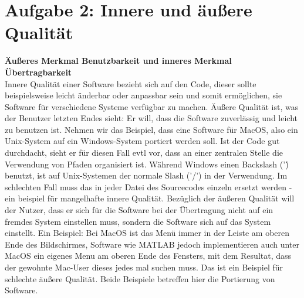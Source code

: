 \documentclass[a4paper,11pt]{article}
\begin{document}
\section*{Aufgabe 2: Innere und äußere Qualität}

\textbf{Äußeres Merkmal Benutzbarkeit und inneres Merkmal Übertragbarkeit
}\\

Innere Qualität einer Software bezieht sich auf den Code, dieser sollte beispielsweise leicht änderbar oder anpassbar sein und somit ermöglichen, sie Software für verschiedene Systeme verfügbar zu machen. Äußere Qualität ist, was der Benutzer letzten Endes sieht: Er will, dass die Software zuverlässig und leicht zu benutzen ist.
Nehmen wir das Beispiel, dass eine Software für MacOS, also ein Unix-System auf ein Windows-System portiert werden soll. Ist der Code gut durchdacht, sieht er für diesen Fall evtl vor, dass an einer zentralen Stelle die Verwendung von Pfaden organisiert ist. Während Windows einen Backslash ('\') benutzt, ist auf Unix-Systemen der normale Slash ('/') in der Verwendung. Im schlechten Fall muss das in jeder Datei des Sourcecodes einzeln ersetzt werden - ein beispiel für mangelhafte innere Qualität.
Bezüglich der äußeren Qualität will der Nutzer, dass er sich für die Software bei der Übertragung nicht auf ein fremdes System einstellen muss, sondern die Software sich auf das System einstellt. Ein Beispiel: Bei MacOS ist das Menü immer in der Leiste am oberen Ende des Bildschirmes, Software wie MATLAB jedoch implementieren auch unter MacOS ein eigenes Menu am oberen Ende des Fensters, mit dem Resultat, dass der gewohnte Mac-User dieses jedes mal suchen muss. Das ist ein Beispiel für schlechte äußere Qualität. Beide Beispiele betreffen hier die Portierung von Software.
\end{document}
